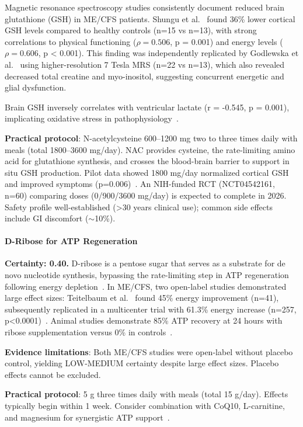 \begin{achievement}
\label{achievement:brain-glutathione-deficit}
Magnetic resonance spectroscopy studies consistently document reduced brain glutathione (GSH) in ME/CFS patients. Shungu et al.~\cite{Shungu2012glutathione} found 36\% lower cortical GSH levels compared to healthy controls (n=15 vs n=13), with strong correlations to physical functioning ($\rho = 0.506$, p = 0.001) and energy levels ($\rho = 0.606$, p < 0.001). This finding was independently replicated by Godlewska et al.~\cite{Godlewska2021glutathione} using higher-resolution 7 Tesla MRS (n=22 vs n=13), which also revealed decreased total creatine and myo-inositol, suggesting concurrent energetic and glial dysfunction.

Brain GSH inversely correlates with ventricular lactate (r = -0.545, p = 0.001), implicating oxidative stress in pathophysiology~\cite{Shungu2012glutathione}.
\end{achievement}

\textbf{Practical protocol}: N-acetylcysteine 600--1200 mg two to three times daily with meals (total 1800--3600 mg/day). NAC provides cysteine, the rate-limiting amino acid for glutathione synthesis, and crosses the blood-brain barrier to support in situ GSH production. Pilot data showed 1800 mg/day normalized cortical GSH and improved symptoms (p=0.006)~\cite{Shungu2016NACtrial}. An NIH-funded RCT (NCT04542161, n=60) comparing doses (0/900/3600 mg/day) is expected to complete in 2026. Safety profile well-established (>30 years clinical use); common side effects include GI discomfort ($\sim$10\%).

\paragraph{D-Ribose for ATP Regeneration}

\begin{speculation}
\label{spec:d-ribose-atp}
\textbf{Certainty: 0.40.} D-ribose is a pentose sugar that serves as a substrate for de novo nucleotide synthesis, bypassing the rate-limiting step in ATP regeneration following energy depletion~\cite{Dodd2004ribose}. In ME/CFS, two open-label studies demonstrated large effect sizes: Teitelbaum et al.~\cite{Teitelbaum2006ribose} found 45\% energy improvement (n=41), subsequently replicated in a multicenter trial with 61.3\% energy increase (n=257, p<0.0001)~\cite{Teitelbaum2012ribose}. Animal studies demonstrate 85\% ATP recovery at 24 hours with ribose supplementation versus 0\% in controls~\cite{Paterson1989ribose}.

\textbf{Evidence limitations}: Both ME/CFS studies were open-label without placebo control, yielding LOW-MEDIUM certainty despite large effect sizes. Placebo effects cannot be excluded.

\textbf{Practical protocol}: 5 g three times daily with meals (total 15 g/day). Effects typically begin within 1 week. Consider combination with CoQ10, L-carnitine, and magnesium for synergistic ATP support~\cite{Sinatra2009metabolic}.
\end{speculation}

